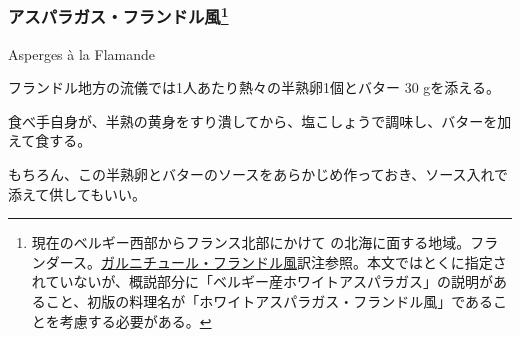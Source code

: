 \begin{recette}

\hypertarget{asperges-a-la-flamande}{%
\subsubsection[アスパラガス・フランドル風]{\texorpdfstring{アスパラガス・フランドル風\footnote{現在のベルギー西部からフランス北部にかけて
  の北海に面する地域。フランダース。\protect\hyperlink{garniture-a-la-flamande}{ガルニチュール・フランドル風}訳注参照。本文ではとくに指定されていないが、概説部分に「ベルギー産ホワイトアスパラガス」の説明があること、初版の料理名が「ホワイトアスパラガス・フランドル風」であることを考慮する必要がある。}}{アスパラガス・フランドル風}}\label{asperges-a-la-flamande}}

\begin{frsubenv}

Asperges à la Flamande

\end{frsubenv}

フランドル地方の流儀では1人あたり熱々の半熟卵1個とバター 30 gを添える。

食べ手自身が、半熟の黄身をすり潰してから、塩こしょうで調味し、バターを加えて食する。

もちろん、この半熟卵とバターのソースをあらかじめ作っておき、ソース入れで添えて供してもいい。

\end{recette}
